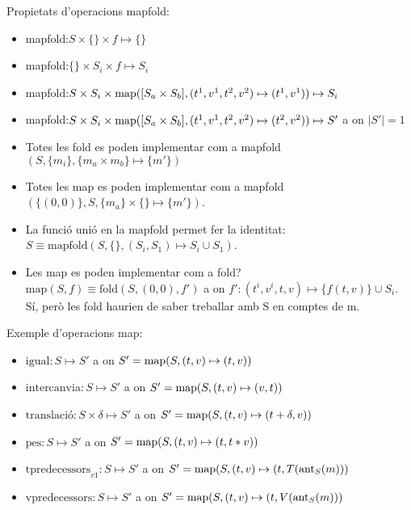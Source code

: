Propietats d'operacions mapfold:
\begin{itemize}
\item mapfold:$S \times \{\} \times f \mapsto \{\}$ 

\item mapfold:$\{\} \times S_i \times f \mapsto S_i$ 

\item mapfold:$S \times S_i \times
  \operatorname*{map}([S_a\times S_b],(t^1,v^1,t^2,v^2)\mapsto(t^1,v^1)) \mapsto S_i$

\item mapfold:$S \times S_i \times \operatorname*{map}([S_a\times
  S_b],(t^1,v^1,t^2,v^2)\mapsto(t^2,v^2)) \mapsto S'$ a on $|S'|=1$

\item Totes les fold es poden implementar com a mapfold$(S,\{m_i\},
  \{m_a \times m_b\} \mapsto \{m'\})$

\item Totes les map es poden implementar com a mapfold$(\{(0,0)\},S,
  \{m_a\} \times  \{\} \mapsto \{m'\})$.


\item La funció unió en la mapfold permet fer la identitat:  $S \equiv
  \text{mapfold}(S,\{\},(S_i,S_1) \mapsto S_i \cup S_1)$.

\item Les map es poden implementar com a fold? $\text{map}(S,f) \equiv
  \text{fold}(S,(0,0),f')$ a on $f': (t^i,v^i,t,v) \mapsto \{f(t,v)\} \cup S_i$. Sí, però les fold haurien de saber treballar amb S en comptes de m.

\end{itemize}



Exemple d'operacions map:
\begin{itemize}
\item $\text{igual}: S \mapsto S'$ a on $S'= \operatorname*{map}(S,(t,v)\mapsto(t,v))$
\item $\text{intercanvia}: S \mapsto S'$ a on $S'= \operatorname*{map}(S,(t,v)\mapsto(v,t))$
\item $\text{translació}: S \times \delta \mapsto S'$ a on $S'=
  \operatorname*{map}(S,(t,v)\mapsto(t+\delta,v))$
\item $\text{pes}: S \mapsto S'$ a on $S'= \operatorname*{map}(S,(t,v)\mapsto(t,t*v))$
\item $\text{tpredecessors}_{v1}: S \mapsto S'$ a on $S'= \operatorname*{map}(S,(t,v)
  \mapsto (t,T(\operatorname*{ant}_S(m)))$ 
\item $\text{vpredecessors}: S \mapsto S'$ a on $S'= \operatorname*{map}(S,(t,v)
  \mapsto (t,V(\operatorname*{ant}_S(m)))$
\end{itemize}

